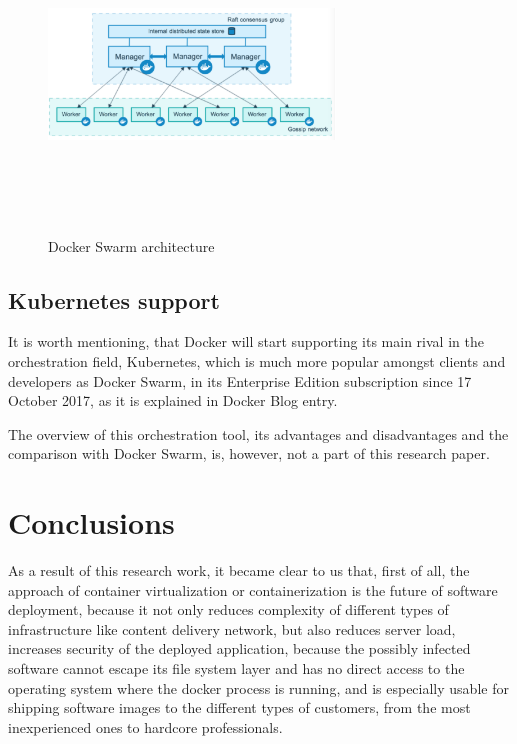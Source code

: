 \begin{figure}
\includegraphics[height=3in, width=3in]{dockerSwarm}
\caption{Docker Swarm architecture}
\cite{DockerSwarmPic}
\label{fig:DockerSwarmPic}
\end{figure}

\subsection{Kubernetes support}

It is worth mentioning,
that Docker will start
supporting its main rival in the orchestration field, Kubernetes,
which is much more popular amongst clients and developers as Docker Swarm,
in its Enterprise Edition subscription since 17 October 2017,
as it is explained in Docker Blog entry\cite{DockerKubernetesSupport}.

The overview of this orchestration tool, its advantages and disadvantages
and the comparison with Docker Swarm, is, however, not a part of
this research paper.

\section{Conclusions}

As a result of this research work, it became clear to us that, first of all,
the approach of container virtualization or containerization
is the future of software deployment, because it not only reduces complexity of
different types of infrastructure like content delivery network,
but also reduces server load,
increases security of the deployed application,
because the possibly infected software cannot
escape its file system layer and has no direct access
to the operating system where the docker process is running, and is
especially usable for shipping software
images to the different types of customers,
from the most inexperienced ones to hardcore professionals.

